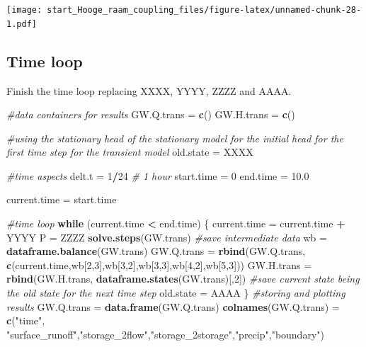 \documentclass[
]{article}
\newenvironment{Shaded}{\begin{snugshade}}{\end{snugshade}}
\newcommand{\CommentTok}[1]{\textcolor[rgb]{0.56,0.35,0.01}{\textit{#1}}}
\newcommand{\ControlFlowTok}[1]{\textcolor[rgb]{0.13,0.29,0.53}{\textbf{#1}}}
\newcommand{\DecValTok}[1]{\textcolor[rgb]{0.00,0.00,0.81}{#1}}
\newcommand{\FloatTok}[1]{\textcolor[rgb]{0.00,0.00,0.81}{#1}}
\newcommand{\FunctionTok}[1]{\textcolor[rgb]{0.13,0.29,0.53}{\textbf{#1}}}
\newcommand{\NormalTok}[1]{#1}
\newcommand{\OtherTok}[1]{\textcolor[rgb]{0.56,0.35,0.01}{#1}}
\newcommand{\SpecialCharTok}[1]{\textcolor[rgb]{0.81,0.36,0.00}{\textbf{#1}}}
\newcommand{\StringTok}[1]{\textcolor[rgb]{0.31,0.60,0.02}{#1}}
\begin{document}
\texttt{[image: start\_Hooge\_raam\_coupling\_files/figure-latex/unnamed-chunk-28-1.pdf]}

\hypertarget{time-loop}{%
\subsection{Time loop}\label{time-loop}}

Finish the time loop replacing XXXX, YYYY, ZZZZ and AAAA.

\begin{Shaded}
\begin{Highlighting}[]
\CommentTok{\#data containers for results}
\NormalTok{GW.Q.trans }\OtherTok{=} \FunctionTok{c}\NormalTok{()}
\NormalTok{GW.H.trans }\OtherTok{=} \FunctionTok{c}\NormalTok{()}

\CommentTok{\#using the stationary head of the stationary model for the initial head for the first time step for the transient model}
\NormalTok{old.state }\OtherTok{=}\NormalTok{ XXXX}

\CommentTok{\#time aspects}
\NormalTok{delt.t }\OtherTok{=} \DecValTok{1}\SpecialCharTok{/}\DecValTok{24} \CommentTok{\# 1 hour}
\NormalTok{start.time }\OtherTok{=} \DecValTok{0}
\NormalTok{end.time }\OtherTok{=}  \FloatTok{10.0}

\NormalTok{current.time }\OtherTok{=}\NormalTok{ start.time}

\CommentTok{\#time loop}
\ControlFlowTok{while}\NormalTok{ (current.time }\SpecialCharTok{\textless{}}\NormalTok{ end.time)}
\NormalTok{\{}
\NormalTok{  current.time }\OtherTok{=}\NormalTok{ current.time }\SpecialCharTok{+}\NormalTok{ YYYY}
\NormalTok{  P }\OtherTok{=}\NormalTok{ ZZZZ}
  \FunctionTok{solve.steps}\NormalTok{(GW.trans)}
  \CommentTok{\#save intermediate data}
\NormalTok{  wb }\OtherTok{=} \FunctionTok{dataframe.balance}\NormalTok{(GW.trans)}
\NormalTok{  GW.Q.trans }\OtherTok{=} \FunctionTok{rbind}\NormalTok{(GW.Q.trans, }\FunctionTok{c}\NormalTok{(current.time,wb[}\DecValTok{2}\NormalTok{,}\DecValTok{3}\NormalTok{],wb[}\DecValTok{3}\NormalTok{,}\DecValTok{2}\NormalTok{],wb[}\DecValTok{3}\NormalTok{,}\DecValTok{3}\NormalTok{],wb[}\DecValTok{4}\NormalTok{,}\DecValTok{2}\NormalTok{],wb[}\DecValTok{5}\NormalTok{,}\DecValTok{3}\NormalTok{]))}
\NormalTok{  GW.H.trans }\OtherTok{=} \FunctionTok{rbind}\NormalTok{(GW.H.trans, }\FunctionTok{dataframe.states}\NormalTok{(GW.trans)[,}\DecValTok{2}\NormalTok{])}
  \CommentTok{\#save current state being the old state for the next time step}
\NormalTok{  old.state }\OtherTok{=}\NormalTok{ AAAA}
\NormalTok{\}}
  \CommentTok{\#storing and plotting results}
\NormalTok{  GW.Q.trans }\OtherTok{=} \FunctionTok{data.frame}\NormalTok{(GW.Q.trans)}
  \FunctionTok{colnames}\NormalTok{(GW.Q.trans) }\OtherTok{=} \FunctionTok{c}\NormalTok{(}\StringTok{"time"}\NormalTok{, }\StringTok{"surface\_runoff"}\NormalTok{,}\StringTok{"storage\_2flow"}\NormalTok{,}\StringTok{"storage\_2storage"}\NormalTok{,}\StringTok{"precip"}\NormalTok{,}\StringTok{"boundary"}\NormalTok{)}
  

\end{Highlighting}
\end{Shaded}
\end{document}
